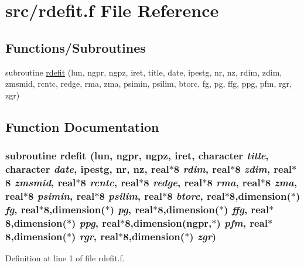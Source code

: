 \hypertarget{rdefit_8f}{
\section{src/rdefit.f File Reference}
\label{rdefit_8f}
}
\subsection*{Functions/Subroutines}
\begin{CompactItemize}
\item 
subroutine \hyperlink{rdefit_8f_1d6293f72a8f0a6e679969729b7701f4}{rdefit} (lun, ngpr, ngpz, iret, title, date, ipestg, nr, nz, rdim, zdim, zmsmid, rcntc, redge, rma, zma, psimin, psilim, btorc, fg, pg, ffg, ppg, pfm, rgr, zgr)
\end{CompactItemize}


\subsection{Function Documentation}
\hypertarget{rdefit_8f_1d6293f72a8f0a6e679969729b7701f4}{
\subsubsection[rdefit]{\setlength{\rightskip}{0pt plus 5cm}subroutine rdefit (lun, \/  ngpr, \/  ngpz, \/  iret, \/  character {\em title}, \/  character {\em date}, \/  ipestg, \/  nr, \/  nz, \/  real$\ast$8 {\em rdim}, \/  real$\ast$8 {\em zdim}, \/  real$\ast$8 {\em zmsmid}, \/  real$\ast$8 {\em rcntc}, \/  real$\ast$8 {\em redge}, \/  real$\ast$8 {\em rma}, \/  real$\ast$8 {\em zma}, \/  real$\ast$8 {\em psimin}, \/  real$\ast$8 {\em psilim}, \/  real$\ast$8 {\em btorc}, \/  real$\ast$8,dimension($\ast$) {\em fg}, \/  real$\ast$8,dimension($\ast$) {\em pg}, \/  real$\ast$8,dimension($\ast$) {\em ffg}, \/  real$\ast$8,dimension($\ast$) {\em ppg}, \/  real$\ast$8,dimension(ngpr,$\ast$) {\em pfm}, \/  real$\ast$8,dimension($\ast$) {\em rgr}, \/  real$\ast$8,dimension($\ast$) {\em zgr})}}
\label{rdefit_8f_1d6293f72a8f0a6e679969729b7701f4}




Definition at line 1 of file rdefit.f.